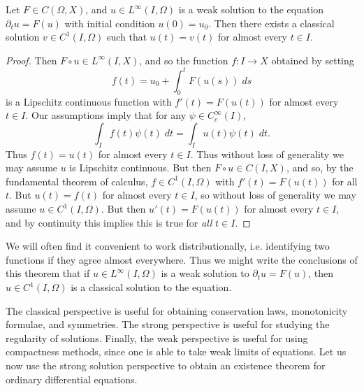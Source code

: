 \begin{lemma}
    Let $F \in C(\Omega,X)$, and $u \in L^\infty(I,\Omega)$ is a weak solution to the equation $\partial_t u = F(u)$ with initial condition $u(0) = u_0$. Then there exists a classical solution $v \in C^1(I,\Omega)$ such that $u(t) = v(t)$ for almost every $t \in I$.
\end{lemma}
\begin{proof}
    Then $F \circ u \in L^\infty(I,X)$, and so the function $f: I \to X$ obtained by setting
    \[ f(t) = u_0 + \int_0^t F(u(s))\; ds \]
    is a Lipschitz continuous function with $f'(t) = F(u(t))$ for almost every $t \in I$. Our assumptions imply that for any $\psi \in C_c^\infty(I)$,
    \[ \int_I f(t) \psi(t)\; dt = \int_I u(t) \psi(t)\; dt. \]
    Thus $f(t) = u(t)$ for almost every $t \in I$. Thus without loss of generality we may assume $u$ is Lipschitz continuous. But then $F \circ u \in C(I,X)$, and so, by the fundamental theorem of calculus, $f \in C^1(I,\Omega)$ with $f'(t) = F(u(t))$ for all $t$. But $u(t) = f(t)$ for almost every $t \in I$, so without loss of generality we may assume $u \in C^1(I,\Omega)$. But then $u'(t) = F(u(t))$ for almost every $t \in I$, and by continuity this implies this is true for \emph{all} $t \in I$.
\end{proof}

\begin{remark}
    We will often find it convenient to work distributionally, i.e. identifying two functions if they agree almost everywhere. Thus we might write the conclusions of this theorem that if $u \in L^\infty(I,\Omega)$ is a weak solution to $\partial_t u = F(u)$, then $u \in C^1(I,\Omega)$ is a classical solution to the equation.
\end{remark}

The classical perspective is useful for obtaining conservation laws, monotonicity formulae, and symmetries. The strong perspective is useful for studying the regularity of solutions. Finally, the weak perspective is useful for using compactness methods, since one is able to take weak limits of equations. Let us now use the strong solution perspective to obtain an existence theorem for ordinary differential equations.

